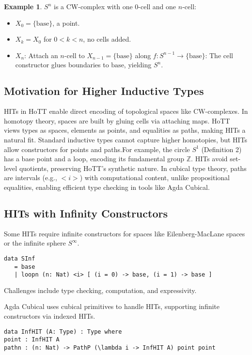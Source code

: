 \documentclass{article}
\theoremstyle{definition}
\newtheorem{example}{Example}
\begin{document}
\begin{example}
\( S^n \) is a CW-complex with one 0-cell and one \( n \)-cell:
\begin{itemize}
    \item \( X_0 = \{ \text{base} \} \), a point.
    \item \( X_k = X_0 \) for \( 0 < k < n \), no cells added.
    \item \( X_n \): Attach an \( n \)-cell to \( X_{n-1} =
      \{ \text{base} \} \) along \( f : S^{n-1} \to
      \{ \text{base} \} \):
    The \( \text{cell} \) constructor glues boundaries to
    \( \text{base} \), yielding \( S^n \).
\end{itemize}
\end{example}

\subsection{Motivation for Higher Inductive Types}
HITs in HoTT enable direct encoding of topological spaces like
CW-complexes. In homotopy theory, spaces are built by gluing
cells via attaching maps. HoTT views types as spaces, elements
as points, and equalities as paths, making HITs a natural fit.
Standard inductive types cannot capture higher homotopies, but
HITs allow constructors for points and paths.For example, the circle \( S^1 \) (Definition 2) has a base
point and a loop, encoding its fundamental group
\( \mathbb{Z} \). HITs avoid set-level quotients, preserving
HoTT’s synthetic nature. In cubical type theory, paths are
intervals (e.g., \( <i> \)) with computational content, unlike
propositional equalities, enabling efficient type checking in
tools like Agda Cubical.

\subsection{HITs with Infinity Constructors}
Some HITs require infinite constructors for spaces like Eilenberg-MacLane spaces or the infinite sphere $S^\infty$.
\begin{lstlisting}
data SInf
   = base
   | loopn (n: Nat) <i> [ (i = 0) -> base, (i = 1) -> base ]
\end{lstlisting}
Challenges include type checking, computation, and expressivity.

Agda Cubical uses cubical primitives to handle HITs, supporting infinite constructors via indexed HITs.
\begin{lstlisting}
data InfHIT (A: Type) : Type where
point : InfHIT A
pathn : (n: Nat) -> PathP (\lambda i -> InfHIT A) point point
\end{lstlisting}
\end{document}
